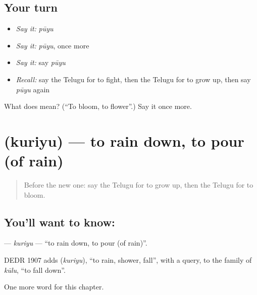 \subsection*{Your turn}
\begin{itemize}
\raggedright
  \item \emph{Say it:} \emph{pūyu}
  \item \emph{Say it:} \emph{pūyu}, once more
  \item \emph{Say it:} say \emph{pūyu}
  \item \emph{Recall:} say the Telugu for to fight, then the Telugu for to grow up, then say \emph{pūyu} again
\end{itemize}

\begin{tcolorbox}[breakable,colback=teal!4,colframe=teal!35!black,title={Before you move on}]
What does  mean? (\textquotedblleft{}To bloom, to flower\textquotedblright{}.) Say it once more.
\end{tcolorbox}
\section[\texorpdfstring{\te{కురియు} (kuriyu)}{కురియు (kuriyu)}]{ (kuriyu) — to rain down, to pour (of rain)}

\label{lesson:TE-C203-kuriyu}



\begin{quote}
Before the new one: say the Telugu for to grow up, then the Telugu for to bloom.
\end{quote}

\subsection*{You'll want to know: }
\textbf{} — \emph{kuriyu} — \textquotedblleft{}to rain down, to pour (of rain)\textquotedblright{}.

\begin{cousinweb}
DEDR 1907 adds \textbf{} (\emph{kuriyu}), \textquotedblleft{}to rain, shower, fall\textquotedblright{}, with a query, to the family of \emph{kūlu}, \textquotedblleft{}to fall down\textquotedblright{}.
\end{cousinweb}

\begin{grammarlens}[title={What you've built}]
One more word for this chapter.
\end{grammarlens}

